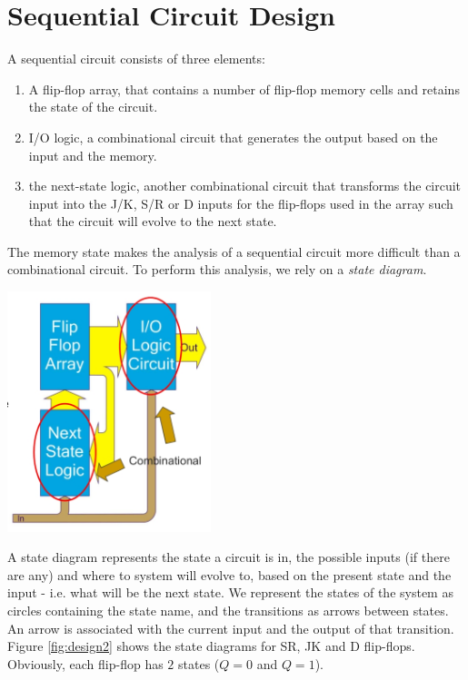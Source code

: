 \section{Sequential Circuit Design}
\label{sec:seq_design}

\begin{minipage}{.6\textwidth}
A sequential circuit consists of three elements:
\begin{enumerate}
	\item A flip-flop array, that contains a number of flip-flop memory cells and retains the state of the circuit.
	\item I/O logic, a combinational circuit that generates the output based on the input and the memory.
	\item the next-state logic, another combinational circuit that transforms the circuit input into the J/K, S/R or D inputs for the flip-flops used in the array such that the circuit will evolve to the next state.
\end{enumerate}
The memory state makes the analysis of a sequential circuit more difficult than a combinational circuit. To perform this analysis, we rely on a \emph{state diagram}.
	
\end{minipage}
\begin{minipage}{.4\textwidth}
	\centering
	\includegraphics[height=7cm]{figures/ch17/design1.jpg}
	\label{fig:design1}
\end{minipage}%

A state diagram represents the state a circuit is in, the possible inputs (if there are any) and where to system will evolve to, based on the present state and the input - i.e. what will be the next state. We represent the states of the system as circles containing the state name, and the transitions as arrows between states. An arrow is associated with the current input and the output of that transition. Figure \ref{fig:design2} shows the state diagrams for SR, JK and D flip-flops. Obviously, each flip-flop has $2$ states ($Q=0$ and $Q=1$).

